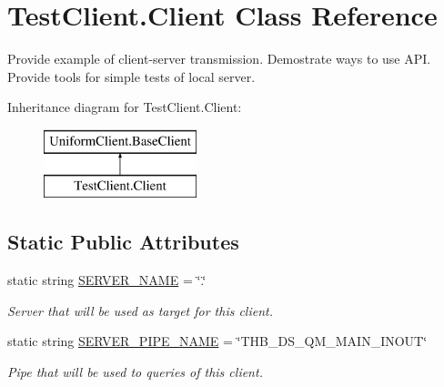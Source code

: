 \hypertarget{class_test_client_1_1_client}{}\section{Test\+Client.\+Client Class Reference}
\label{class_test_client_1_1_client}


Provide example of client-\/server transmission. Demostrate ways to use A\+PI. Provide tools for simple tests of local server.  


Inheritance diagram for Test\+Client.\+Client\+:\begin{figure}[H]
\begin{center}
\leavevmode
\includegraphics[height=2.000000cm]{d6/dac/class_test_client_1_1_client}
\end{center}
\end{figure}
\subsection*{Static Public Attributes}
\begin{DoxyCompactItemize}
\item 
static string \mbox{\hyperlink{class_test_client_1_1_client_a7fdac87931c97ce7fde6c4fc622bcfa6}{S\+E\+R\+V\+E\+R\+\_\+\+N\+A\+ME}} = \char`\"{}.\char`\"{}
\begin{DoxyCompactList}\small\item\em Server that will be used as target for this client. \end{DoxyCompactList}\item 
static string \mbox{\hyperlink{class_test_client_1_1_client_a58c70d565592caa15b99d9b145a133ea}{S\+E\+R\+V\+E\+R\+\_\+\+P\+I\+P\+E\+\_\+\+N\+A\+ME}} = \char`\"{}T\+H\+B\+\_\+\+D\+S\+\_\+\+Q\+M\+\_\+\+M\+A\+I\+N\+\_\+\+I\+N\+O\+UT\char`\"{}
\begin{DoxyCompactList}\small\item\em Pipe that will be used to queries of this client. \end{DoxyCompactList}\end{DoxyCompactItemize}
